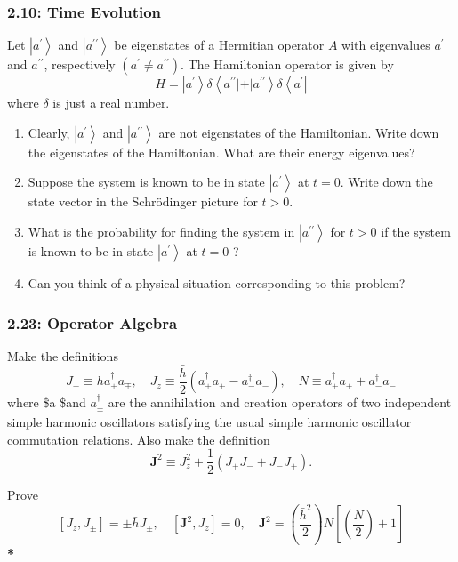 \documentclass[11pt]{article}
\begin{document}
\subsubsection{2.10: Time Evolution}
\label{sec:org581fe83}
Let \(\left|a^{\prime}\right\rangle\) and \(\left|a^{\prime
\prime}\right\rangle\) be eigenstates of a Hermitian operator \(A\) with
eigenvalues \(a^{\prime}\) and \(a^{\prime \prime}\), respectively \(\left(a^{\prime}
\neq a^{\prime \prime}\right)\). The Hamiltonian operator is given by $$
H=\left|a^{\prime}\right\rangle \delta\left\langle a^{\prime \prime}|+|
a^{\prime \prime}\right\rangle \delta\left\langle a^{\prime}\right| $$ where
\(\delta\) is just a real number.
\begin{enumerate}
\item Clearly, \(\left|a^{\prime}\right\rangle\) and \(\left|a^{\prime
   \prime}\right\rangle\) are not eigenstates of the Hamiltonian. Write down the
eigenstates of the Hamiltonian. What are their energy eigenvalues?
\item Suppose the system is known to be in state \(\left|a^{\prime}\right\rangle\) at
\(t=0\). Write down the state vector in the Schrödinger picture for \(t>0\).
\item What is the probability for finding the system in \(\left|a^{\prime
   \prime}\right\rangle\) for \(t>0\) if the system is known to be in state
\(\left|a^{\prime}\right\rangle\) at \(t=0\) ?
\item Can you think of a physical situation corresponding to this problem?
\end{enumerate}
\subsubsection{2.23: Operator Algebra}
\label{sec:org70be559}
Make the definitions $$ J_{ \pm} \equiv h a_{ \pm}^{\dagger} a_{\mp}, \quad J_z
\equiv \frac{\bar{h}}{2}\left(a_{+}^{\dagger} a_{+}-a_{-}^{\dagger}
a_{-}\right), \quad N \equiv a_{+}^{\dagger} a_{+}+a_{-}^{\dagger} a_{-} $$
where \$a\textsubscript{ \textpm{}}\$and \(a_{ \pm}^{\dagger}\) are the annihilation and creation
operators of two independent simple harmonic oscillators satisfying the usual
simple harmonic oscillator commutation relations. Also make the definition $$
\mathbf{J}^2 \equiv J_z^2+\frac{1}{2}\left(J_{+} J_{-}+J_{-} J_{+}\right) . $$

Prove $$ \left[J_z, J_{ \pm}\right]= \pm \bar{h} J_{ \pm},
\quad\left[\mathbf{J}^2, J_z\right]=0, \quad
\mathbf{J}^2=\left(\frac{\bar{h}^2}{2}\right)
N\left[\left(\frac{N}{2}\right)+1\right] $$
\textbf{*}
\end{document}
